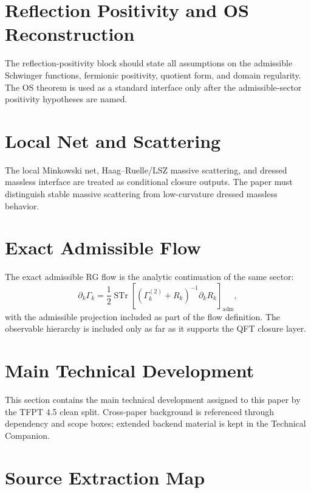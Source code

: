 \documentclass[11pt,a4paper]{article}
\begin{document}
\section{Reflection Positivity and OS Reconstruction}

The reflection-positivity block should state all assumptions on the admissible Schwinger functions,
fermionic positivity, quotient form, and domain regularity. The OS theorem is used as a standard
interface only after the admissible-sector positivity hypotheses are named.

\section{Local Net and Scattering}

The local Minkowski net, Haag--Ruelle/LSZ massive scattering, and dressed massless interface are
treated as conditional closure outputs. The paper must distinguish stable massive scattering from
low-curvature dressed massless behavior.

\section{Exact Admissible Flow}

The exact admissible RG flow is the analytic continuation of the same sector:
\[
\partial_k\Gamma_k
=
\frac12\operatorname{STr}\left[(\Gamma_k^{(2)}+R_k)^{-1}\partial_kR_k\right]_{\mathrm{adm}},
\]
with the admissible projection included as part of the flow definition. The observable hierarchy is
included only as far as it supports the QFT closure layer.

\clearpage
\section{Main Technical Development}

This section contains the main technical development assigned to this paper by the TFPT 4.5 clean split. Cross-paper background is referenced through dependency and scope boxes; extended backend material is kept in the Technical Companion.



\section{Source Extraction Map}
\end{document}
